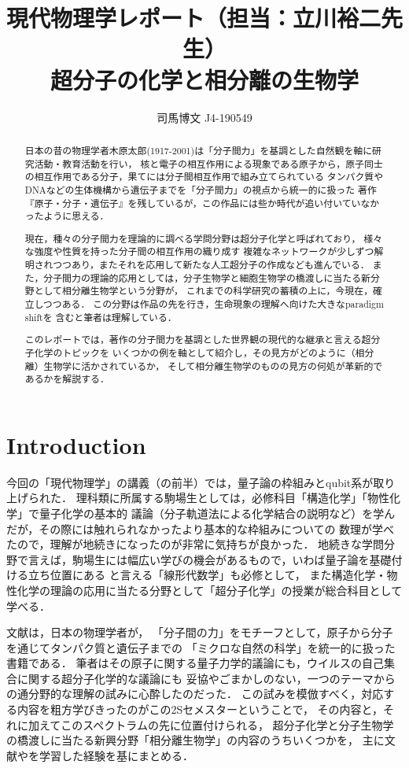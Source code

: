 \documentclass[uplatex,dvipdfmx]{jsarticle}
\title{現代物理学レポート（担当：立川裕二先生）\\超分子の化学と相分離の生物学}
\author{司馬博文 J4-190549}
\begin{document}
\maketitle
\begin{abstract}
    日本の昔の物理学者木原太郎(1917-2001)は「分子間力」を基調とした自然観を軸に研究活動・教育活動を行い，
    核と電子の相互作用による現象である原子から，原子同士の相互作用である分子，果てには分子間相互作用で組み立てられている
    タンパク質やDNAなどの生体機構から遺伝子までを「分子間力」の視点から統一的に扱った
    著作『原子・分子・遺伝子』\cite{木原太郎-遺伝子}を残しているが，この作品には些か時代が追い付いていなかったように思える．
    
    現在，種々の分子間力を理論的に調べる学問分野は超分子化学と呼ばれており，
    様々な強度や性質を持った分子間の相互作用の織り成す
    複雑なネットワークが少しずつ解明されつつあり，またそれを応用して新たな人工超分子の作成なども進んでいる．
    また，分子間力の理論的応用としては，分子生物学と細胞生物学の橋渡しに当たる新分野として相分離生物学という分野が，
    これまでの科学研究の蓄積の上に，今現在，確立しつつある．
    この分野は作品\cite{木原太郎-遺伝子}の先を行き，生命現象の理解へ向けた大きなparadigm shiftを
    含むと筆者は理解している．
    
    このレポートでは，著作\cite{木原太郎-遺伝子}の分子間力を基調とした世界観の現代的な継承と言える超分子化学のトピックを
    いくつかの例を軸として紹介し，その見方がどのように（相分離）生物学に活かされているか，
    そして相分離生物学のものの見方の何処が革新的であるかを解説する．
\end{abstract}
\tableofcontents

\section{Introduction}

今回の「現代物理学」の講義（の前半）では，量子論の枠組みとqubit系が取り上げられた．
理科類に所属する駒場生としては，必修科目「構造化学」「物性化学」で量子化学の基本的
議論（分子軌道法による化学結合の説明など）を学んだが，その際には触れられなかったより基本的な枠組みについての
数理が学べたので，理解が地続きになったのが非常に気持ちが良かった．
地続きな学問分野で言えば，駒場生には幅広い学びの機会があるもので，いわば量子論を基礎付ける立ち位置にある
と言える「線形代数学」も必修として，
また構造化学・物性化学の理論の応用に当たる分野として「超分子化学」の授業が総合科目として学べる．

文献\cite{木原太郎-遺伝子}は，日本の物理学者が，
「分子間の力」をモチーフとして，原子から分子を通じてタンパク質と遺伝子までの
「ミクロな自然の科学」を統一的に扱った書籍である．
筆者はその原子に関する量子力学的議論にも，ウイルスの自己集合に関する超分子化学的な議論にも
妥協やごまかしのない，一つのテーマからの通分野的な理解の試みに心酔したのだった．
この試みを模倣すべく，対応する内容を粗方学びきったのがこの2Sセメスターということで，
その内容と，それに加えてこのスペクトラムの先に位置付けられる，
超分子化学と分子生物学の橋渡しに当たる新興分野「相分離生物学」の内容のうちいくつかを，
主に文献\cite{平岡秀一}や\cite{白木賢太郎}を学習した経験を基にまとめる．
\end{document}
